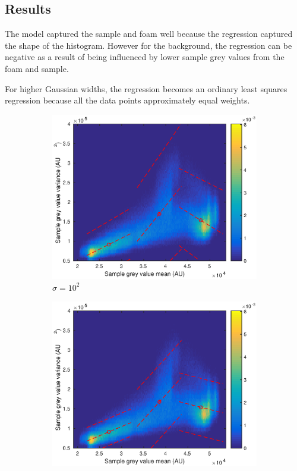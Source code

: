 \documentclass[12pt]{report}
\begin{document}
\subsection{Results}

The model captured the sample and foam well because the regression captured the shape of the histogram. However for the background, the regression can be negative as a result of being influenced by lower sample grey values from the foam and sample.

For higher Gaussian widths, the regression becomes an ordinary least squares regression because all the data points approximately equal weights.

\begin{figure}
	\centering
	\begin{subfigure}{0.45\textwidth}
		\includegraphics[width=\textwidth]{figures/meanVar/gaussian_1.eps}
		\caption{$\sigma=10^2$}
	\end{subfigure}
	\begin{subfigure}{0.45\textwidth}
		\includegraphics[width=\textwidth]{figures/meanVar/gaussian_2.eps}

\end{subfigure}
\end{figure}
\end{document}
